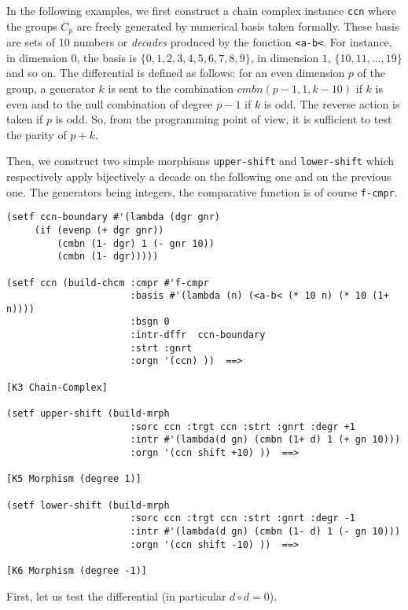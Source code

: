 In the following examples, we first construct a chain complex instance {\tt ccn}
where the groups $C_p$ are freely generated by numerical basis taken formally.
These basis are sets of $10$ numbers or {\em decades} produced by the fonction {\tt <a-b<}. 
For instance, in dimension $0$, the basis is $\lbrace 0,1,2,3,4,5,6,7,8,9 \rbrace$,
in dimension $1$, $\lbrace 10,11,\ldots,19 \rbrace$ and so on.
The differential is defined as follows: for an even dimension $p$ of the group,
a generator $k$ is sent to the combination $cmbn (p-1, 1, k-10)$ if $k$ is even
and to the null combination of degree $p-1$ if $k$ is odd. The reverse action
is taken if $p$ is odd. So, from the programming point of view, it is sufficient to test the
parity of $p+k$.\par
Then, we construct two simple morphisms {\tt upper-shift} and {\tt lower-shift} which
respectively apply bijectively a decade on the following one and on the previous one.
The generators being integers,  the comparative function is of course {\tt f-cmpr}.
{\footnotesize\begin{verbatim}
(setf ccn-boundary #'(lambda (dgr gnr)
     (if (evenp (+ dgr gnr))
         (cmbn (1- dgr) 1 (- gnr 10))
         (cmbn (1- dgr)))))

(setf ccn (build-chcm :cmpr #'f-cmpr
                      :basis #'(lambda (n) (<a-b< (* 10 n) (* 10 (1+ n))))
                      :bsgn 0
                      :intr-dffr  ccn-boundary
                      :strt :gnrt
                      :orgn '(ccn) ))  ==>

[K3 Chain-Complex]

(setf upper-shift (build-mrph 
                      :sorc ccn :trgt ccn :strt :gnrt :degr +1 
                      :intr #'(lambda(d gn) (cmbn (1+ d) 1 (+ gn 10)))
                      :orgn '(ccn shift +10) ))  ==>

[K5 Morphism (degree 1)]

(setf lower-shift (build-mrph 
                      :sorc ccn :trgt ccn :strt :gnrt :degr -1 
                      :intr #'(lambda(d gn) (cmbn (1- d) 1 (- gn 10)))
                      :orgn '(ccn shift -10) ))  ==>

[K6 Morphism (degree -1)]
\end{verbatim}}
First, let us test the differential (in particular $d \circ d =0$).
